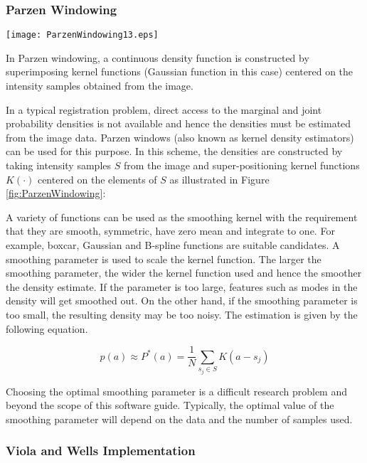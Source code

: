 \subsubsection{Parzen Windowing}


\begin{floatingfigure}[rlp]{0.5\textwidth}
 \centering
 \texttt{[image: ParzenWindowing13.eps]}
 \caption[Parzen Windowing in Mutual Information]{
In Parzen windowing, a continuous density function is constructed by
superimposing kernel functions (Gaussian function in this case) centered on the
intensity samples obtained from the image.\label{fig:ParzenWindowing}}
\end{floatingfigure}

In a typical registration problem, direct access to the marginal
and joint probability densities is not available and hence the
densities must be estimated from the image data. Parzen windows
(also known as kernel density estimators) can be used for this purpose.
In this scheme, the densities are constructed by taking intensity
samples $S$ from the image and super-positioning kernel functions
$K(\cdot)$ centered on the elements of $S$ as illustrated in
Figure \ref{fig:ParzenWindowing}:

A variety of functions can be used as the smoothing kernel with the
requirement that they are smooth, symmetric, have zero mean and
integrate to one. For example, boxcar, Gaussian and B-spline functions are
suitable candidates.  A smoothing parameter is used to scale the kernel
function.  The larger the smoothing parameter, the wider the kernel function
used and hence the smoother the density estimate. If the parameter is too
large, features such as modes in the density will get smoothed out.  On the
other hand, if the smoothing parameter is too small, the resulting density
may be too noisy. The estimation is given by the following equation.

\begin{equation}
p(a) \approx P^{*}(a) = \frac{1}{N} \sum_{s_j \in S} K\left(a - s_j\right)
\end{equation}

Choosing the optimal smoothing parameter is a difficult research problem and
beyond the scope of this software guide.  Typically, the optimal value of the
smoothing parameter will depend on the data and the number of samples used.

\subsubsection{Viola and Wells Implementation}

